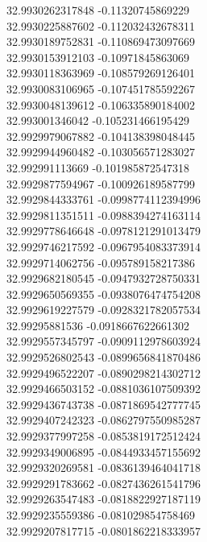 {32.9930262317848	-0.11320745869229\\
32.9930225887602	-0.112032432678311\\
32.9930189752831	-0.110869473097669\\
32.9930153912103	-0.10971845863069\\
32.9930118363969	-0.108579269126401\\
32.9930083106965	-0.107451785592267\\
32.9930048139612	-0.106335890184002\\
32.993001346042	-0.105231466195429\\
32.9929979067882	-0.104138398048445\\
32.9929944960482	-0.103056571283027\\
32.992991113669	-0.101985872547318\\
32.9929877594967	-0.100926189587799\\
32.9929844333761	-0.0998774112394996\\
32.9929811351511	-0.0988394274163114\\
32.9929778646648	-0.0978121291013479\\
32.9929746217592	-0.0967954083373914\\
32.9929714062756	-0.095789158217386\\
32.9929682180545	-0.0947932728750331\\
32.9929650569355	-0.0938076474754208\\
32.9929619227579	-0.0928321782057534\\
32.99295881536	-0.0918667622661302\\
32.9929557345797	-0.0909112978603924\\
32.9929526802543	-0.0899656841870486\\
32.9929496522207	-0.0890298214302712\\
32.9929466503152	-0.0881036107509392\\
32.9929436743738	-0.0871869542777745\\
32.9929407242323	-0.0862797550985287\\
32.9929377997258	-0.0853819172512424\\
32.9929349006895	-0.0844933457155692\\
32.9929320269581	-0.0836139464041718\\
32.9929291783662	-0.0827436261541796\\
32.9929263547483	-0.0818822927187119\\
32.9929235559386	-0.081029854758469\\
32.9929207817715	-0.0801862218333957\\
}
